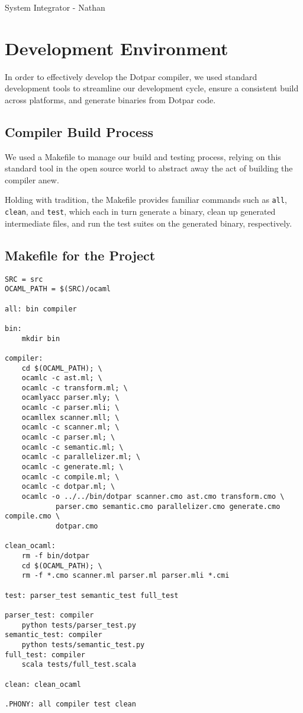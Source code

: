 System Integrator - Nathan

\section{Development Environment}

In order to effectively develop the Dotpar compiler, we used standard
development tools to streamline our development cycle, ensure a
consistent build across platforms, and generate binaries from Dotpar
code.

\subsection{Compiler Build Process}

We used a Makefile to manage our build and testing process, relying on
this standard tool in the open source world to abstract away the act
of building the compiler anew.

Holding with tradition, the Makefile provides familiar commands such
as \texttt{all}, \texttt{clean}, and \texttt{test}, which each in turn
generate a binary, clean up generated intermediate files, and run the
test suites on the generated binary, respectively. 

\subsection{Makefile for the Project}

\begin{verbatim}
SRC = src
OCAML_PATH = $(SRC)/ocaml

all: bin compiler

bin:
	mkdir bin
	
compiler:
	cd $(OCAML_PATH); \
	ocamlc -c ast.ml; \
	ocamlc -c transform.ml; \
	ocamlyacc parser.mly; \
	ocamlc -c parser.mli; \
	ocamllex scanner.mll; \
	ocamlc -c scanner.ml; \
	ocamlc -c parser.ml; \
	ocamlc -c semantic.ml; \
	ocamlc -c parallelizer.ml; \
	ocamlc -c generate.ml; \
	ocamlc -c compile.ml; \
	ocamlc -c dotpar.ml; \
	ocamlc -o ../../bin/dotpar scanner.cmo ast.cmo transform.cmo \
			parser.cmo semantic.cmo parallelizer.cmo generate.cmo compile.cmo \
			dotpar.cmo

clean_ocaml:
	rm -f bin/dotpar
	cd $(OCAML_PATH); \
	rm -f *.cmo scanner.ml parser.ml parser.mli *.cmi

test: parser_test semantic_test full_test

parser_test: compiler
	python tests/parser_test.py
semantic_test: compiler
	python tests/semantic_test.py
full_test: compiler
	scala tests/full_test.scala

clean: clean_ocaml

.PHONY: all compiler test clean
\end{verbatim}


